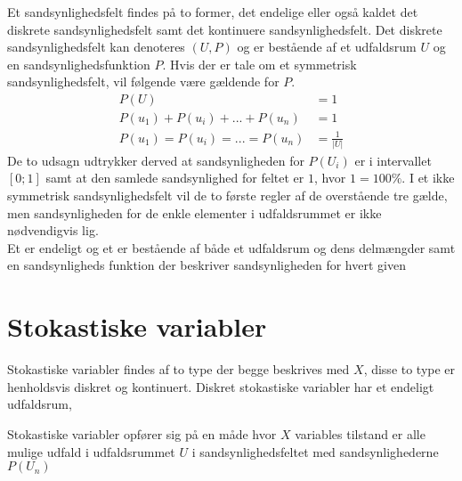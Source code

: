 \documentclass[../../SRP.tex]{subfiles}
\begin{document}
Et sandsynlighedsfelt findes på to former, det endelige eller også kaldet det diskrete sandsynlighedsfelt samt det kontinuere sandsynlighedsfelt. Det diskrete sandsynlighedsfelt kan denoteres $(U, P)$ og er bestående af et udfaldsrum $U$ og en sandsynlighedsfunktion $P$. Hvis der er tale om et symmetrisk sandsynlighedsfelt, vil følgende være gældende for $P$.
\begin{align}
  P(U) &= 1 \\
  P(u_1) + P(u_i) + ... + P(u_n) &= 1 \\
  P(u_1) = P(u_i) = ... = P(u_n) &= \frac{1}{|U|}
\end{align}
De to udsagn udtrykker derved at sandsynligheden for $P(U_i)$ er i intervallet $[0;1]$ samt at den samlede sandsynlighed for feltet er $1$, hvor $1 = 100\%$. I et ikke symmetrisk sandsynlighedsfelt vil de to første regler af de overstående tre gælde, men sandsynligheden for de enkle elementer i udfaldsrummet er ikke nødvendigvis lig. \\

Et er endeligt og et er bestående af både et udfaldsrum og dens delmængder samt en sandsynligheds funktion der beskriver sandsynligheden for hvert given  \cite{SC}

\section{Stokastiske variabler}

Stokastiske variabler findes af to type der begge beskrives med $X$, disse to type er henholdsvis diskret og kontinuert. Diskret stokastiske variabler har et endeligt udfaldsrum,

Stokastiske variabler opfører sig på en måde hvor $X$ variables tilstand er alle mulige udfald i udfaldsrummet $U$ i sandsynlighedsfeltet med sandsynlighederne $P(U_n)$
\end{document}
